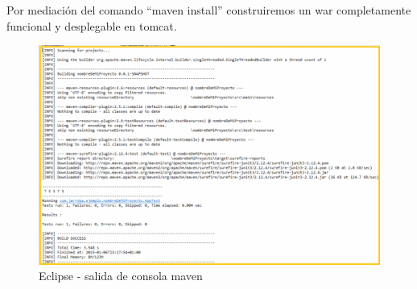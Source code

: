Por mediación del comando “maven install” construiremos un war completamente funcional y desplegable en tomcat. 

\begin{figure}[H]
	\centering
	\includegraphics[width=0.7\linewidth]{figuras/maven/maven3}
	\caption{Eclipse - salida de consola maven}
	\label{fig:mvn3}
\end{figure}